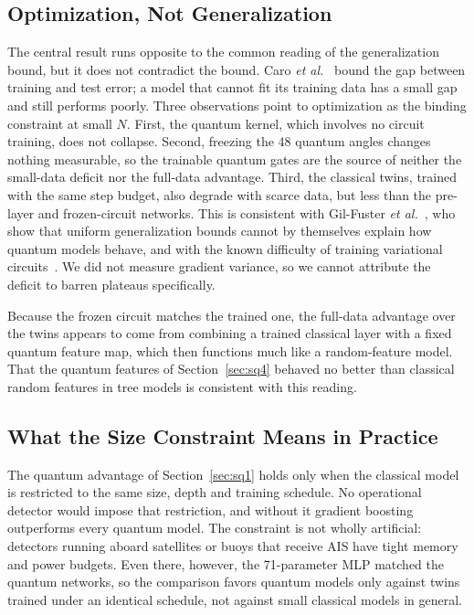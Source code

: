 \documentclass[journal]{IEEEtran}
\begin{document}
\subsection{Optimization, Not Generalization}
The central result runs opposite to the common reading of the generalization
bound, but it does not contradict the bound. Caro
\textit{et al.}~\cite{caro2022generalization} bound the gap between training and
test error; a model that cannot fit its training data has a small gap and still
performs poorly. Three observations point to optimization as the binding
constraint at small $N$. First, the quantum kernel, which involves no circuit
training, does not collapse. Second, freezing the 48 quantum angles changes
nothing measurable, so the trainable quantum gates are the source of neither the
small-data deficit nor the full-data advantage. Third, the classical twins,
trained with the same step budget, also degrade with scarce data, but less than
the pre-layer and frozen-circuit networks. This is consistent with Gil-Fuster
\textit{et al.}~\cite{gilfuster2024rethinking}, who show that uniform
generalization bounds cannot by themselves explain how quantum models behave,
and with the known difficulty of training variational
circuits~\cite{cerezo2021vqa,larocca2025barren}. We did not measure gradient
variance, so we cannot attribute the deficit to barren plateaus specifically.

Because the frozen circuit matches the trained one, the full-data advantage over
the twins appears to come from combining a trained classical layer with a fixed
quantum feature map, which then functions much like a random-feature model.
That the quantum features of Section~\ref{sec:sq4} behaved no better than
classical random features in tree models is consistent with this reading.

\subsection{What the Size Constraint Means in Practice}
The quantum advantage of Section~\ref{sec:sq1} holds only when the classical
model is restricted to the same size, depth and training schedule. No
operational detector would impose that restriction, and without it gradient
boosting outperforms every quantum model. The constraint is not wholly
artificial: detectors running aboard satellites or buoys that receive AIS have
tight memory and power budgets. Even there, however, the 71-parameter MLP
matched the quantum networks, so the comparison favors quantum models only
against twins trained under an identical schedule, not against small classical
models in general.
\end{document}
